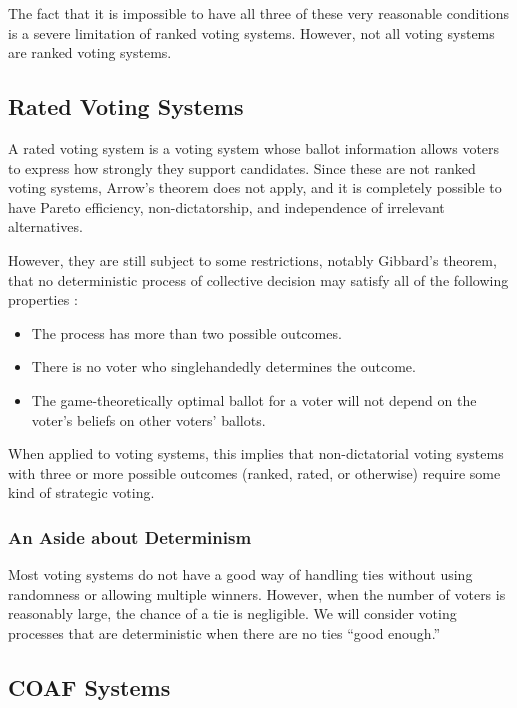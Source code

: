 \documentclass[11pt]{article}
\begin{document}
    The fact that it is impossible to have all three of these very reasonable conditions is a
    severe limitation of ranked voting systems.
    However, not all voting systems are ranked voting systems.

    \subsection{Rated Voting Systems}\label{subsec:rated-voting-systems}

    A rated voting system is a voting system whose ballot information allows voters to express
    how strongly they support candidates.
    Since these are not ranked voting systems, Arrow's theorem does not apply,
    and it is completely possible to have Pareto efficiency,
    non-dictatorship, and independence of irrelevant alternatives.

    However, they are still subject to some restrictions, notably Gibbard's theorem,
    that no deterministic process of collective decision may satisfy all of the following properties \cite{Gibbard}:

    \begin{itemize}
        \item The process has more than two possible outcomes.
        \item There is no voter who singlehandedly determines the outcome.
        \item The game-theoretically optimal ballot for a voter will not depend on
        the voter's beliefs on other voters' ballots.
    \end{itemize}

    When applied to voting systems, this implies that non-dictatorial voting systems
    with three or more possible outcomes (ranked, rated, or otherwise)
    require some kind of strategic voting.

    \subsubsection{An Aside about Determinism}

    Most voting systems do not have a good way of handling ties without
    using randomness or allowing multiple winners.
    However, when the number of voters is reasonably large, the chance of a tie is negligible.
    We will consider voting processes that are deterministic when there are no ties ``good enough.''

    \subsection{COAF Systems}\label{subsec:coaf-systems}
\end{document}
